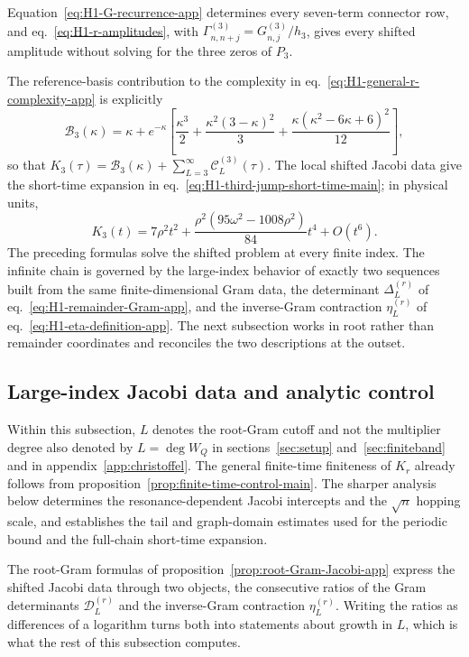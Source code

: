 \documentclass[a4paper,11pt]{article}
\def\ee{e}%
\theoremstyle{definition}
\theoremstyle{remark}
\newcommand{\ee}{\mathrm e}
\begin{document}
Equation~\eqref{eq:H1-G-recurrence-app} determines every
seven-term connector row, and eq.~\eqref{eq:H1-r-amplitudes}, with
\(\Gamma_{n,n+j}^{(3)}=G_{n,j}^{(3)}/h_3\), gives every shifted amplitude
without solving for the three zeros of \(P_3\).

The reference-basis contribution to the complexity in eq.~\eqref{eq:H1-general-r-complexity-app} is explicitly
\begin{equation}
   \mathcal B_3(\kappa)=\kappa+\ee^{-\kappa}
   \left[
      \frac{\kappa^3}{2}
      +\frac{\kappa^2(3-\kappa)^2}{3}
      +\frac{\kappa(\kappa^2-6\kappa+6)^2}{12}
   \right],
   \label{eq:H1-r3-baseline-app}
\end{equation}
so that $K_3(\tau)=\mathcal B_3(\kappa)+\sum_{L=3}^{\infty}\mathcal C_L^{(3)}(\tau)$. The local shifted Jacobi data give the short-time expansion in eq.~\eqref{eq:H1-third-jump-short-time-main}; in physical units,
\begin{equation}
   K_3(t)=7\rho^2t^2+
   \frac{\rho^2(95\omega^2-1008\rho^2)}{84}t^4+O(t^6).
   \label{eq:H1-r3-short-time-physical-app}
\end{equation}
The preceding formulas solve the shifted problem at every finite index. %
The infinite chain is governed by the large-index behavior of exactly two sequences built from the same finite-dimensional Gram data, the determinant $\Delta_L^{(r)}$ of eq.~\eqref{eq:H1-remainder-Gram-app}, and the inverse-Gram contraction $\eta_L^{(r)}$ of eq.~\eqref{eq:H1-eta-definition-app}. The next subsection works in root rather than remainder coordinates and reconciles the two descriptions at the outset.%

\subsection{Large-index Jacobi data and analytic control}
\label{app:H1-large-index}

Within this subsection, $L$ denotes the root-Gram cutoff and not the
multiplier degree %
also denoted by $L=\deg W_Q$ in sections~\ref{sec:setup} and~\ref{sec:finiteband} and in
appendix~\ref{app:christoffel}.
The general finite-time finiteness of $K_r$ already follows from
proposition~\ref{prop:finite-time-control-main}.  The sharper analysis below
determines the resonance-dependent Jacobi intercepts and the
$\sqrt n$ hopping scale, and establishes the tail and graph-domain estimates
used for the periodic bound and the full-chain short-time expansion.

The root-Gram formulas of proposition~\ref{prop:root-Gram-Jacobi-app} express the shifted Jacobi
data through two objects, the consecutive ratios of the Gram determinants $\mathcal D_L^{(r)}$ and
the inverse-Gram contraction $\eta_L^{(r)}$. Writing the ratios as differences of a logarithm
turns both into statements about growth in $L$, which is what the rest of this subsection
computes.
\end{document}
